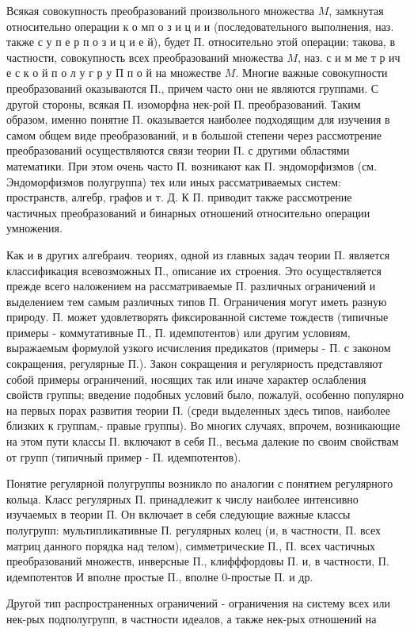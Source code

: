 \documentclass[10pt]{article}
\begin{document}
Всякая совокупность преобразований произвольного множества $M$, замкнутая относительно операции к о мп о з и ц и и (последовательного выполнения, наз. также с у п е р п о з и ц и е й), будет П. относительно этой операции; такова, в частности, совокупность всех преобразований множества $M$, наз. с и м ме т р ич е с к о й п о л у г р у П п о й на множестве $M$. Многие важные совокупности преобразований оказываются П., причем часто они не являются группами. С другой стороны, всякая П. изоморфна нек-рой П. преобразований. Таким образом, именно понятие П. оказывается наиболее подходящим для изучения в самом общем виде преобразований, и в большой степени через рассмотрение преобразований осуществляются связи теории П. с другими областями математики. При этом очень часто П. возникают как П. эндоморфизмов (см. Эндоморфизмов полугруппа) тех или иных рассматриваемых систем: пространств, алгебр, графов и т. Д. К П. приводит также рассмотрение частичных преобразований и бинарных отношений относительно операции умножения.



Как и в других алгебраич. теориях, одной из главных задач теории П. является классификация всевозможных П., описание их строения. Это осуществляется прежде всего наложением на рассматриваемые П. различных ограничений и выделением тем самым различных типов П. Ограничения могут иметь разную природу. П. может удовлетворять фиксированной системе тождеств (типичные примеры - коммутативные П., П. идемпотентов) или другим условиям, выражаемым формулой узкого исчисления предикатов (примеры - П. с законом сокращения, регулярные П.). Закон сокращения и регулярность представляют собой примеры ограничений, носящих так или иначе характер ослабления свойств группы; введение подобных условий было, пожалуй, особенно популярно на первых порах развития теории П. (среди выделенных здесь типов, наиболее близких к группам,- правые группы). Во многих случаях, впрочем, возникающие на этом пути классы П. включают в себя П., весьма далекие по своим свойствам от групп (типичный пример - П. идемпотентов).



Понятие регулярной полугруппы возникло по аналогии с понятием регулярного кольца. Класс регулярных П. принадлежит к числу наиболее интенсивно изучаемых в теории П. Он включает в себя следующие важные классы полугрупп: мультипликативные П. регулярных колец (и, в частности, П. всех матриц данного порядка над телом), симметрические П., П. всех частичных преобразований множеств, инверсные П., клифффордовы П. и, в частности, П. идемпотентов И вполне простые П., вполне 0-простые П. и др.



Другой тип распространенных ограничений - ограничения на систему всех или нек-рых подполугрупп, в частности идеалов, а также нек-рых отношений на
\end{document}
